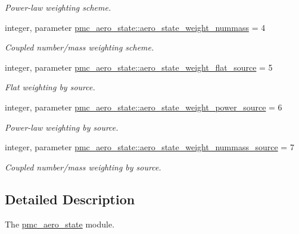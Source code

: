 \begin{DoxyCompactItemize}
\begin{DoxyCompactList}\small\item\em Power-\/law weighting scheme. \end{DoxyCompactList}\item 
integer, parameter \mbox{\hyperlink{namespacepmc__aero__state_aa014d0549b2455e245bef4959b781af3}{pmc\+\_\+aero\+\_\+state\+::aero\+\_\+state\+\_\+weight\+\_\+nummass}} = 4
\begin{DoxyCompactList}\small\item\em Coupled number/mass weighting scheme. \end{DoxyCompactList}\item 
integer, parameter \mbox{\hyperlink{namespacepmc__aero__state_af731fa16fa6f5f7dcb5dde7bc5118b5a}{pmc\+\_\+aero\+\_\+state\+::aero\+\_\+state\+\_\+weight\+\_\+flat\+\_\+source}} = 5
\begin{DoxyCompactList}\small\item\em Flat weighting by source. \end{DoxyCompactList}\item 
integer, parameter \mbox{\hyperlink{namespacepmc__aero__state_a496284ecee4a72a18a45e67f5c17e610}{pmc\+\_\+aero\+\_\+state\+::aero\+\_\+state\+\_\+weight\+\_\+power\+\_\+source}} = 6
\begin{DoxyCompactList}\small\item\em Power-\/law weighting by source. \end{DoxyCompactList}\item 
integer, parameter \mbox{\hyperlink{namespacepmc__aero__state_a22b883c1a2ba3797a44ab2a4104c9d2a}{pmc\+\_\+aero\+\_\+state\+::aero\+\_\+state\+\_\+weight\+\_\+nummass\+\_\+source}} = 7
\begin{DoxyCompactList}\small\item\em Coupled number/mass weighting by source. \end{DoxyCompactList}\end{DoxyCompactItemize}


\subsection{Detailed Description}
The \mbox{\hyperlink{namespacepmc__aero__state}{pmc\+\_\+aero\+\_\+state}} module. 

